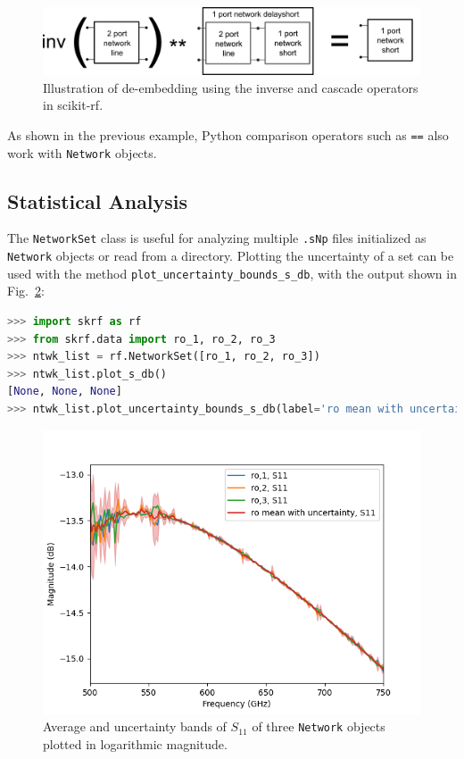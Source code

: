 \documentclass{IEEEjmw}
\begin{document}
\begin{figure}
	\centering
	\includegraphics[width=0.95\linewidth]{figures/deembedding}
	\caption{Illustration of de-embedding using the inverse and cascade operators in scikit-rf.}
	\label{fig:deembedding}
\end{figure}

As shown in the previous example, Python comparison operators such as \texttt{==} also work with \texttt{Network} objects. 

\subsection{Statistical Analysis}
The \texttt{NetworkSet} class is useful for analyzing multiple \texttt{.sNp} files initialized as \texttt{Network} objects or read from a directory. Plotting the uncertainty of a set can be used with the method \texttt{plot\_uncertainty\_bounds\_s\_db}, with the output shown in Fig.~\ref{fig:figure5}:

\begin{lstlisting}[language=Python]
>>> import skrf as rf
>>> from skrf.data import ro_1, ro_2, ro_3
>>> ntwk_list = rf.NetworkSet([ro_1, ro_2, ro_3])
>>> ntwk_list.plot_s_db()
[None, None, None]
>>> ntwk_list.plot_uncertainty_bounds_s_db(label='ro mean with uncertainty, S11')
\end{lstlisting}

\begin{figure}
	\centering
	\includegraphics[width=0.95\linewidth]{figures/s11_uncertainty.png}
	\caption{Average and uncertainty bands of $S_{11}$ of three \texttt{Network} objects plotted in logarithmic magnitude.}
	\label{fig:figure5}
\end{figure}
\end{document}
